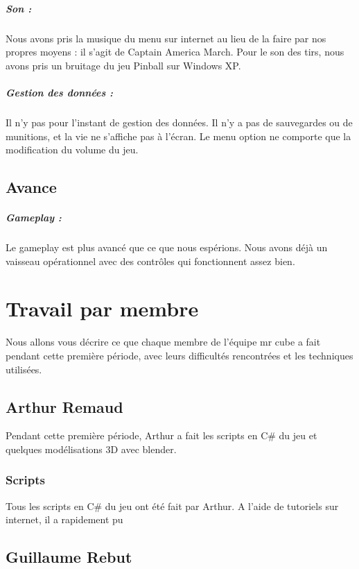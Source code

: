 \documentclass[10pt, titlepage]{report}
\begin{document}
\paragraph{Son :}
Nous avons pris la musique du menu sur internet au lieu de la faire par nos propres moyens : il s'agit de Captain America March. Pour le son des tirs, nous avons pris un bruitage du jeu Pinball sur Windows XP.

\paragraph{Gestion des données :}
Il n'y pas pour l'instant de gestion des données. Il n'y a pas de sauvegardes ou de munitions, et la vie ne s'affiche pas à l'écran. Le menu option ne comporte que la modification du volume du jeu.

\section{Avance}

\paragraph{Gameplay :}
Le gameplay est plus avancé que ce que nous espérions. Nous avons déjà un vaisseau opérationnel avec des contrôles qui fonctionnent assez bien.

\chapter{Travail par membre}
Nous allons vous décrire ce que chaque membre de l'équipe mr cube a fait pendant cette première période, avec leurs difficultés rencontrées et les techniques utilisées.

\section{Arthur Remaud}

Pendant cette première période, Arthur a fait les scripts en C\# du jeu et quelques modélisations 3D avec blender.

\subsection{Scripts}
Tous les scripts en C\# du jeu ont été fait par Arthur. A l'aide de tutoriels sur internet, il a rapidement pu 

\section{Guillaume Rebut}
\end{document}
